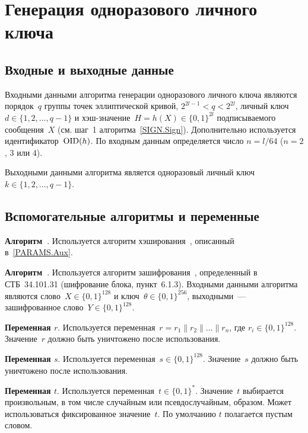\section{Генерация одноразового личного ключа}\label{GENK}

\subsection{Входные и выходные данные}

Входными данными алгоритма генерации одноразового 
личного ключа являются порядок~$q$ группы точек эллиптической кривой, 
$2^{2l-1}<q<2^{2l}$,
личный ключ $d\in\{1,2,\ldots,q-1\}$ 
и хэш-значение~$H=h(X)\in\{0,1\}^{2l}$ подписываемого сообщения~$X$
(см. шаг~1 алгоритма~\ref{SIGN.Sign}). 
%
Дополнительно используется идентификатор~$\text{\normalfont OID}(h)$.
%
По входным данным определяется число $n=l/64$
($n=2$, $3$ или $4$).
                                                        
Выходными данными алгоритма является одноразовый личный
ключ~$k\in\{1,2,\ldots,{q-1}\}$.

\subsection{Вспомогательные алгоритмы и переменные}

{\bf Алгоритм~}.
Используется алгоритм хэширования~, 
описанный в~\ref{PARAMS.Aux}.

{\bf Алгоритм~}.
Используется алгоритм зашифрования~, 
определенный в СТБ~34.101.31 (шифрование блока, пункт~6.1.3).
Входными данными алгоритма являются слово~$X\in\{0,1\}^{128}$
и ключ~$\theta\in\{0,1\}^{256}$,
выходными~--- зашифрованное слово~$Y\in\{0,1\}^{128}$.

{\bf Переменная $r$}.
Используется переменная~$r=r_1\parallel r_2\parallel\ldots\parallel r_n$,
где $r_i\in\{0,1\}^{128}$.
%
Значение~$r$ должно быть уничтожено после использования.

{\bf Переменная $s$}.
Используется переменная~$s\in\{0,1\}^{128}$.
Значение~$s$ должно быть уничтожено после использования.

{\bf Переменная $t$}.
Используется переменная~$t\in\{0,1\}^*$.
Значение~$t$ выбирается произвольным, в том числе случайным
или псевдослучайным, образом. Может использоваться
фиксированное значение~$t$. По умолчанию $t$ полагается
пустым словом.
                                               
